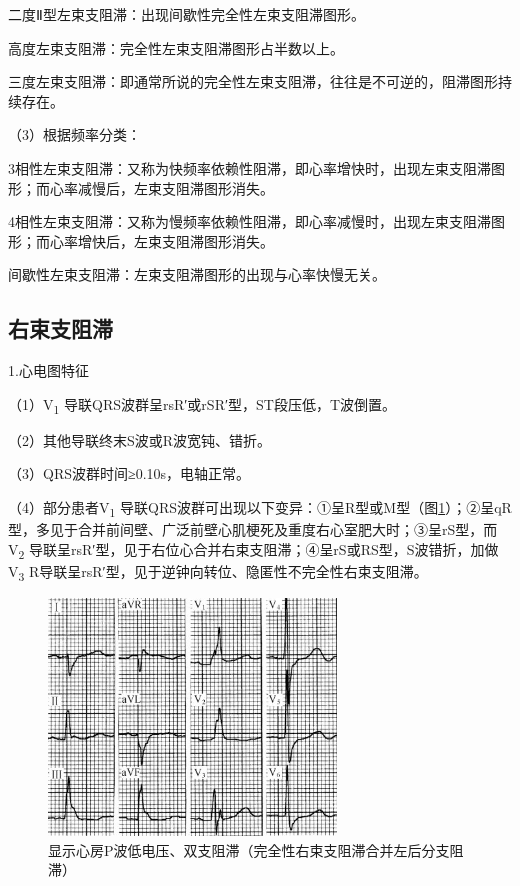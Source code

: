 二度Ⅱ型左束支阻滞：出现间歇性完全性左束支阻滞图形。

高度左束支阻滞：完全性左束支阻滞图形占半数以上。

三度左束支阻滞：即通常所说的完全性左束支阻滞，往往是不可逆的，阻滞图形持续存在。

（3）根据频率分类：

3相性左束支阻滞：又称为快频率依赖性阻滞，即心率增快时，出现左束支阻滞图形；而心率减慢后，左束支阻滞图形消失。

4相性左束支阻滞：又称为慢频率依赖性阻滞，即心率减慢时，出现左束支阻滞图形；而心率增快后，左束支阻滞图形消失。

间歇性左束支阻滞：左束支阻滞图形的出现与心率快慢无关。

\protect\hypertarget{text00028.htmlux5cux23subid345}{}{}

\subsection{右束支阻滞}

1.心电图特征

（1）V\textsubscript{1} 导联QRS波群呈rsR′或rSR′型，ST段压低，T波倒置。

（2）其他导联终末S波或R波宽钝、错折。

（3）QRS波群时间≥0.10s，电轴正常。

（4）部分患者V\textsubscript{1}
导联QRS波群可出现以下变异：①呈R型或M型（图\ref{fig21-4}）；②呈qR型，多见于合并前间壁、广泛前壁心肌梗死及重度右心室肥大时；③呈rS型，而V\textsubscript{2}
导联呈rsR′型，见于右位心合并右束支阻滞；④呈rS或RS型，S波错折，加做V\textsubscript{3}
R导联呈rsR′型，见于逆钟向转位、隐匿性不完全性右束支阻滞。

\begin{figure}[!htbp]
 \centering
 \includegraphics[width=3.01042in,height=2.47917in]{./images/Image00352.jpg}
 \captionsetup{justification=centering}
 \caption{显示心房P波低电压、双支阻滞（完全性右束支阻滞合并左后分支阻滞）}
 \label{fig21-4}
  \end{figure} 

